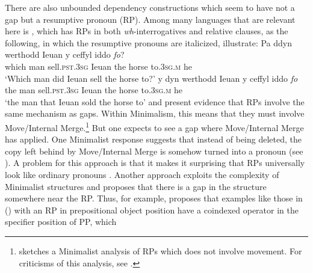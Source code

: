 \documentclass[output=paper
 	        ,biblatex
                ,babelshorthands
                ,newtxmath
                ,draftmode
                ,colorlinks, citecolor=brown
]{langscibook}
\begin{document}

There are also unbounded dependency constructions which seem to have not a gap but a resumptive pronoun (RP). Among many languages that are relevant here is , which has RPs in both \emph{wh}-interrogatives and relative clauses, as the following, in which the resumptive pronouns are italicized, illustrate:
\eal
\ex
\gll Pa	ddyn werthodd Ieuan y ceffyl iddo \emph{fo}?\\
     which man sell.\textsc{pst}.\textsc{3sg} Ieuan the horse to.\textsc{3sg.m} he\\
\glt`Which man did Ieuan sell the horse to?'
\ex 
\gll y dyn werthodd Ieuan y ceffyl iddo \emph{fo}\\
the man sell.\textsc{pst}.\textsc{3sg} Ieuan the horse to.\textsc{3sg.m} he\\
\glt`the man that Ieuan sold the horse to'
\zl
\citet{Willis.2011} and \citet{Borsley.2010,Borsley2013a-u} present evidence that  RPs involve
the same mechanism as gaps. Within Minimalism, this means that they must involve Move/Internal
Merge.\footnote{%
  \citet{Rouveret2008a-u} 
sketches a Minimalist analysis of  RPs which does not involve movement. For
  criticisms of this analysis, see .
} But one expects to see a gap where Move/Internal Merge has applied. One Minimalist response
suggests that instead of being deleted, the copy left behind by Move/Internal Merge is somehow
turned into a pronoun (see \citealt[]{McCloskey.2006}). A problem for this approach is that it makes
it surprising that RPs universally look like ordinary pronouns \citep{McCloskey2002a-u}.
Another approach exploits the complexity of
Minimalist structures and proposes that there is a gap in the structure somewhere near the RP.
Thus, for example, \citet[]{Willis.2011} proposes that examples like those in () with an RP in
prepositional object position have a coindexed operator in the specifier position of PP, which
\end{document}
